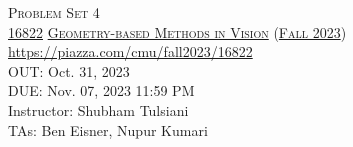 \documentclass[11pt,addpoints,answers]{exam}
\title{\textsc{\hwName}} %
\author{}
\date{}
\date{}
\numberwithin{equation}{section} %
\numberwithin{figure}{section} %
\numberwithin{table}{section} %
\newcommand{\courseNum}{\href{https://geometric3d.github.io}{16822}}
\newcommand{\courseName}{\href{https://geometric3d.github.io}{Geometry-based Methods in Vision}}
\newcommand{\courseSem}{\href{https://geometric3d.github.io}{Fall 2023}}
\newcommand{\courseUrl}{\url{https://piazza.com/cmu/fall2023/16822}}
\newcommand{\hwNum}{Problem Set 4}
\newcommand{\hwTopic}{N-view Geometry}
\newcommand{\outDate}{Oct. 31, 2023}
\newcommand{\dueDate}{Nov. 07, 2023 11:59 PM}
\newcommand{\instructorName}{Shubham Tulsiani}
\newcommand{\taNames}{Ben Eisner, Nupur Kumari}
\begin{document}
\section*{}
\begin{center}
  \textsc{\LARGE \hwNum} \\
  \vspace{1em}
  \textsc{\large \courseNum{} \courseName{} (\courseSem)} \\
  \courseUrl\\
  \vspace{1em}
  OUT: \outDate \\
  DUE: \dueDate \\
  Instructor: \instructorName \\
  TAs: \taNames
\end{center}
\end{document}

